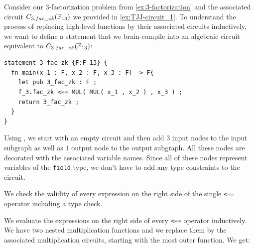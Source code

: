 \begin{example}[$3$-factorization] Consider our $3$-factorization problem from \examplename{} \ref{ex:3-factorization} and the associated circuit $C_{3.fac\_zk}(\mathbb{F}_{13})$ we provided in \examplename{} \ref{ex:TJJ-circuit_1}. To understand the process of replacing high-level functions by their associated circuits inductively, we want to define a  statement that we brain-compile into an algebraic circuit equivalent to $C_{3.fac\_zk}(\mathbb{F}_{13})$:
\begin{lstlisting}
statement 3_fac_zk {F:F_13} {
  fn main(x_1 : F, x_2 : F, x_3 : F) -> F{
	let pub 3_fac_zk : F ;
    f_3.fac_zk <== MUL( MUL( x_1 , x_2 ) , x_3 ) ;
    return 3_fac_zk ;
  }
}
\end{lstlisting} 
Using , we start with an empty circuit and then add $3$ input nodes to the input subgraph as well as $1$ output node to the output subgraph. All these nodes are decorated with the associated variable names. Since all of these nodes represent variables of the \texttt{field} type, we don't have to add any type constraints to the circuit.

We check the validity of every expression on the right side of the single \texttt{<==} operator including a type check. 

We evaluate the expressions on the right side of every \texttt{<==} operator inductively. We have two nested multiplication functions and we replace them by the associated multiplication circuits, starting with the most outer function. We get: 
\begin{center}
\end{center}
\end{example}

